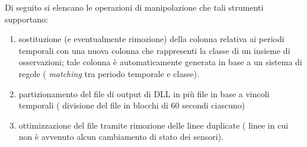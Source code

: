 Di seguito si elencano le operazioni di manipolazione che tali strumenti supportano:
\begin{enumerate}
    \item sostituzione (e eventualmente rimozione) della colonna relativa ai periodi temporali con una nuova colonna che rappresenti la classe di un insieme di osservazioni; tale colonna è automaticamente generata in base a un sistema di regole (\eg{} \emph{matching} tra periodo temporale e classe).
    \item partizionamento del file di output di  \acs{DLL} in più file in base a vincoli temporali (\eg{} divisione del file in blocchi di $60$ secondi ciascuno)
    \item ottimizzazione del file tramite rimozione delle linee duplicate (\ie{} linee in cui non è avvenuto alcun cambiamento di stato dei sensori).
\end{enumerate}

